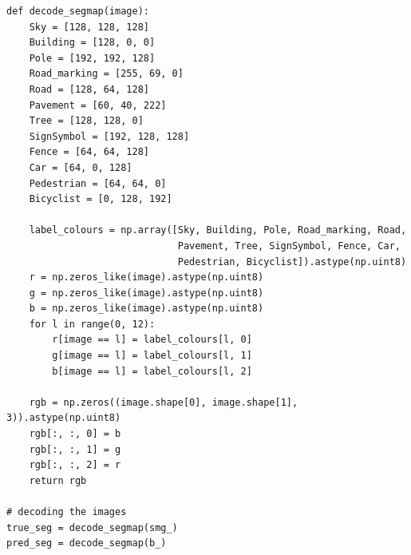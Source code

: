 \begin{enumerate}
\begin{lstlisting}
def decode_segmap(image):
    Sky = [128, 128, 128]
    Building = [128, 0, 0]
    Pole = [192, 192, 128]
    Road_marking = [255, 69, 0]
    Road = [128, 64, 128]
    Pavement = [60, 40, 222]
    Tree = [128, 128, 0]
    SignSymbol = [192, 128, 128]
    Fence = [64, 64, 128]
    Car = [64, 0, 128]
    Pedestrian = [64, 64, 0]
    Bicyclist = [0, 128, 192]

    label_colours = np.array([Sky, Building, Pole, Road_marking, Road,
                              Pavement, Tree, SignSymbol, Fence, Car,
                              Pedestrian, Bicyclist]).astype(np.uint8)
    r = np.zeros_like(image).astype(np.uint8)
    g = np.zeros_like(image).astype(np.uint8)
    b = np.zeros_like(image).astype(np.uint8)
    for l in range(0, 12):
        r[image == l] = label_colours[l, 0]
        g[image == l] = label_colours[l, 1]
        b[image == l] = label_colours[l, 2]

    rgb = np.zeros((image.shape[0], image.shape[1], 3)).astype(np.uint8)
    rgb[:, :, 0] = b
    rgb[:, :, 1] = g
    rgb[:, :, 2] = r
    return rgb

# decoding the images
true_seg = decode_segmap(smg_)
pred_seg = decode_segmap(b_)


\end{lstlisting}
\end{enumerate}
